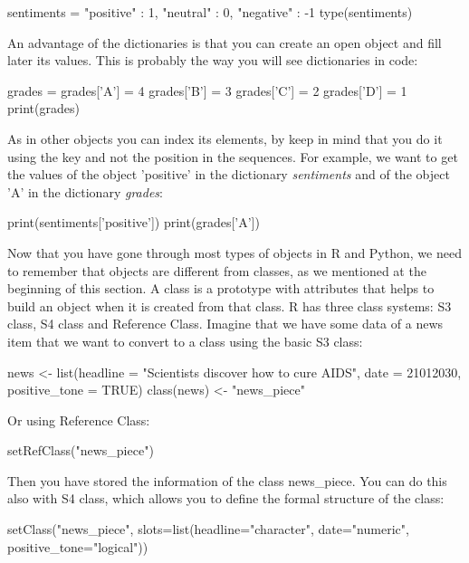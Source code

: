\begin{examplepy}
sentiments = {"positive" : 1, "neutral" : 0, "negative" : -1}
type(sentiments)
\end{examplepy}

An advantage of the dictionaries is that you can create an open object and fill later its values. This is probably the way you will see dictionaries in code:

\begin{examplepy}
grades =  {}
grades['A'] = 4
grades['B'] = 3
grades['C'] = 2
grades['D'] = 1
print(grades)
\end{examplepy}

As in other objects you can index its elements, by keep in mind that you do it using the key and not the position in the sequences. For example, we want to get the values of the object 'positive' in the dictionary \emph{sentiments} and of the object 'A' in the dictionary \emph{grades}:

\begin{examplepy}
print(sentiments['positive'])
print(grades['A'])
\end{examplepy}

Now that you have gone through most types of objects in R and Python, we need to remember that objects are different from classes, as we mentioned at the beginning of this section. A class is a prototype with attributes that helps to build an object when it is created from that class. R has three class systems: S3 class, S4 class and Reference Class.  Imagine that we have some data of a news item that we want to convert to a class using the basic S3 class:

\begin{exampler}
news <- list(headline = "Scientists discover how to cure AIDS", date = 21012030, positive_tone = TRUE)
class(news) <- "news_piece"
\end{exampler}

Or using Reference Class:

\begin{exampler}
setRefClass("news_piece")
\end{exampler}

Then you have stored the information of the class news\_piece.  You can do this also with S4 class, which allows you to define the formal structure of the class:

\begin{exampler}
setClass("news_piece", slots=list(headline="character", date="numeric", positive_tone="logical"))
\end{exampler}

